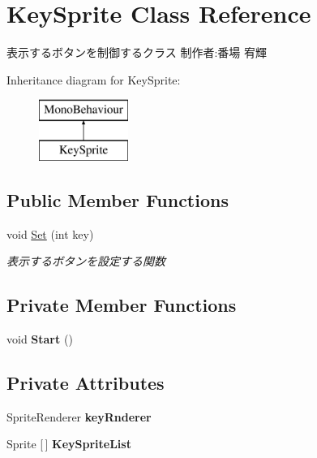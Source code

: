 \hypertarget{class_key_sprite}{}\section{Key\+Sprite Class Reference}
\label{class_key_sprite}


表示するボタンを制御するクラス 制作者\+:番場 宥輝  


Inheritance diagram for Key\+Sprite\+:\begin{figure}[H]
\begin{center}
\leavevmode
\includegraphics[height=2.000000cm]{class_key_sprite}
\end{center}
\end{figure}
\subsection*{Public Member Functions}
\begin{DoxyCompactItemize}
\item 
void \hyperlink{class_key_sprite_a04255b122af47585fc67ac88d83f4900}{Set} (int key)
\begin{DoxyCompactList}\small\item\em 表示するボタンを設定する関数 \end{DoxyCompactList}\end{DoxyCompactItemize}
\subsection*{Private Member Functions}
\begin{DoxyCompactItemize}
\item 
\mbox{\label{class_key_sprite_aa8b9262c016724193d135062e3bf8513}} 
void {\bfseries Start} ()
\end{DoxyCompactItemize}
\subsection*{Private Attributes}
\begin{DoxyCompactItemize}
\item 
\mbox{\label{class_key_sprite_a8163016ab880ba2a450d528976966ebf}} 
Sprite\+Renderer {\bfseries key\+Rnderer}
\item 
\mbox{\label{class_key_sprite_a5ba0b8a837002515ab2a27c0b921734c}} 
Sprite \mbox{[}$\,$\mbox{]} {\bfseries Key\+Sprite\+List}
\end{DoxyCompactItemize}


